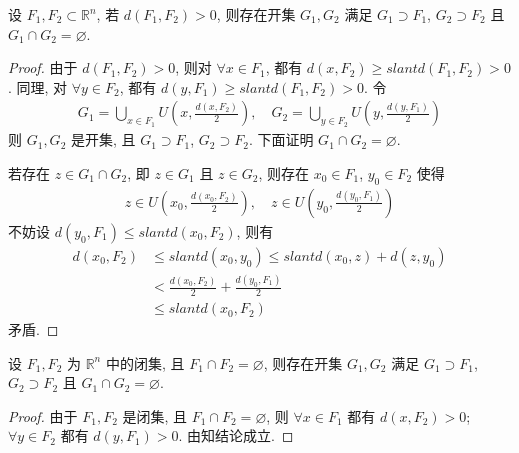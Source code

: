 \documentclass[../../main.tex]{subfiles}
\begin{document}
\begin{theorem}\label{theorem:距离大于零的两个集合中一定存在两个无交的子集}
设 $F_1, F_2 \subset \mathbb{R}^n$, 若 $d(F_1, F_2) > 0$, 则存在开集 $G_1, G_2$ 满足 $G_1 \supset F_1$, $G_2 \supset F_2$ 且 $G_1 \cap G_2 = \varnothing$.
\end{theorem}
\begin{proof}
由于 $d(F_1, F_2) > 0$, 则对 $\forall x \in F_1$, 都有 $d(x, F_2) \geqslant slant d(F_1, F_2) > 0$. 同理, 对 $\forall y \in F_2$, 都有 $d(y, F_1) \geqslant slant d(F_1, F_2) > 0$. 令
\begin{align*}
G_1 = \bigcup_{x \in F_1} U\left(x, \frac{d(x, F_2)}{2}\right), \quad G_2 = \bigcup_{y \in F_2} U\left(y, \frac{d(y, F_1)}{2}\right)
\end{align*}
则 $G_1, G_2$ 是开集, 且 $G_1 \supset F_1$, $G_2 \supset F_2$. 下面证明 $G_1 \cap G_2 = \varnothing$.

若存在 $z \in G_1 \cap G_2$, 即 $z \in G_1$ 且 $z \in G_2$, 则存在 $x_0 \in F_1$, $y_0 \in F_2$ 使得
\begin{align*}
z \in U\left(x_0, \frac{d(x_0, F_2)}{2}\right), \quad z \in U\left(y_0, \frac{d(y_0, F_1)}{2}\right)
\end{align*}
不妨设 $d(y_0, F_1) \leqslant slant d(x_0, F_2)$, 则有
\begin{align*}
d(x_0, F_2) &\leqslant slant d(x_0, y_0) \leqslant slant d(x_0, z) + d(z, y_0)\\
&< \frac{d(x_0, F_2)}{2} + \frac{d(y_0, F_1)}{2}\\
&\leqslant slant d(x_0, F_2)
\end{align*}
矛盾.
\end{proof}

\begin{theorem}[分离定理]\label{theorem:分离定理}
设 $F_1, F_2$ 为 $\mathbb{R}^n$ 中的闭集, 且 $F_1 \cap F_2 = \varnothing$, 则存在开集 $G_1, G_2$ 满足 $G_1 \supset F_1$, $G_2 \supset F_2$ 且 $G_1 \cap G_2 = \varnothing$.
\end{theorem}
\begin{proof}
由于 $F_1, F_2$ 是闭集, 且 $F_1 \cap F_2 = \varnothing$, 则 $\forall x \in F_1$ 都有 $d(x, F_2) > 0$; $\forall y \in F_2$ 都有 $d(y, F_1) > 0$. 由知结论成立.
\end{proof}
\end{document}
